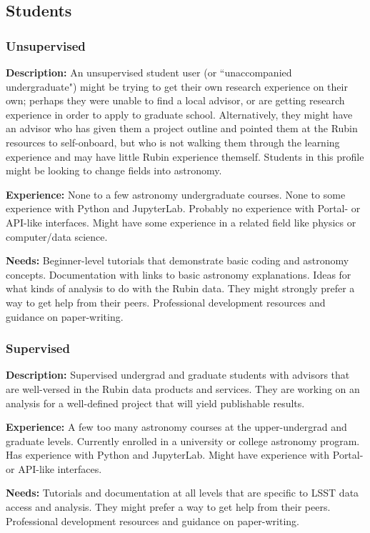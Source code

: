 \subsection{Students}

\subsubsection{Unsupervised}

\textbf{Description:} 
An unsupervised student user (or ``unaccompanied undergraduate") might be trying
to get their own research experience on their own; perhaps they were unable to find
a local advisor, or are getting research experience in order to apply to graduate school.
Alternatively, they might have an advisor who has given them a project outline and pointed
them at the Rubin resources to self-onboard, but who is not walking them through
the learning experience and may have little Rubin experience themself.
Students in this profile might be looking to change fields into astronomy.

\textbf{Experience:}
None to a few astronomy undergraduate courses.
None to some experience with Python and JupyterLab.
Probably no experience with Portal- or API-like interfaces.
Might have some experience in a related field like physics or computer/data science.

\textbf{Needs:}
Beginner-level tutorials that demonstrate basic coding and astronomy concepts.
Documentation with links to basic astronomy explanations.
Ideas for what kinds of analysis to do with the Rubin data.
They might strongly prefer a way to get help from their peers.
Professional development resources and guidance on paper-writing.

\subsubsection{Supervised}

\textbf{Description:} 
Supervised undergrad and graduate students with advisors that are well-versed
in the Rubin data products and services.
They are working on an analysis for a well-defined project that will yield publishable results.

\textbf{Experience:} 
A few too many astronomy courses at the upper-undergrad and graduate levels.
Currently enrolled in a university or college astronomy program.
Has experience with Python and JupyterLab.
Might have experience with Portal- or API-like interfaces.

\textbf{Needs:}
Tutorials and documentation at all levels that are specific to LSST data access and analysis.
They might prefer a way to get help from their peers.
Professional development resources and guidance on paper-writing.

